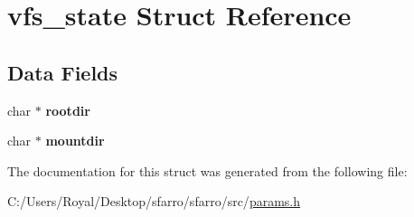 \hypertarget{structvfs__state}{}\section{vfs\+\_\+state Struct Reference}
\label{structvfs__state}
\subsection*{Data Fields}
\begin{DoxyCompactItemize}
\item 
char $\ast$ {\bfseries rootdir}\hypertarget{structvfs__state_abfa8235e8883ad174cffafa86d96a1c7}{}\label{structvfs__state_abfa8235e8883ad174cffafa86d96a1c7}

\item 
char $\ast$ {\bfseries mountdir}\hypertarget{structvfs__state_a690c3d11ea9aed32762709f57b5062b2}{}\label{structvfs__state_a690c3d11ea9aed32762709f57b5062b2}

\end{DoxyCompactItemize}


The documentation for this struct was generated from the following file\+:\begin{DoxyCompactItemize}
\item 
C\+:/\+Users/\+Royal/\+Desktop/sfarro/sfarro/src/\hyperlink{params_8h}{params.\+h}\end{DoxyCompactItemize}
